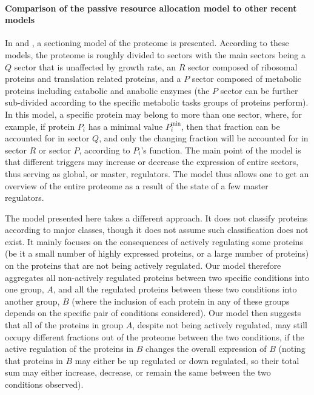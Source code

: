 \documentclass[10pt,letterpaper]{article}
\begin{document}
\paragraph{Comparison of the passive resource allocation model to other recent models}
In \cite{Scott2010,Scott2011,Scott2014} and \cite{Hui_2015}, a sectioning model of the proteome is presented.
According to these models, the proteome is roughly divided to sectors with the main sectors being a $Q$ sector that is unaffected by growth rate, an $R$ sector composed of ribosomal proteins and translation related proteins, and a $P$ sector composed of metabolic proteins including catabolic and anabolic enzymes (the $P$ sector can be further sub-divided according to the specific metabolic tasks groups of proteins perform).
In this model, a specific protein may belong to more than one sector, where, for example, if protein $P_i$ has a minimal value $P_i^{\min}$, then that fraction can be accounted for in sector $Q$, and only the changing fraction will be accounted for in sector $R$ or sector $P$, according to $P_i$'s function.
The main point of the model is that different triggers may increase or decrease the expression of entire sectors, thus serving as global, or master, regulators.
The model thus allows one to get an overview of the entire proteome as a result of the state of a few master regulators.

The model presented here takes a different approach.
It does not classify proteins according to major classes, though it does not assume such classification does not exist.
It mainly focuses on the consequences of actively regulating some proteins (be it a small number of highly expressed proteins, or a large number of proteins) on the proteins that are not being actively regulated.
Our model therefore aggregates all non-actively regulated proteins between two specific conditions into one group, $A$, and all the regulated proteins between these two conditions into another group, $B$ (where the inclusion of each protein in any of these groups depends on the specific pair of conditions considered).
Our model then suggests that all of the proteins in group $A$, despite not being actively regulated, may still occupy different fractions out of the proteome between the two conditions, if the active regulation of the proteins in $B$ changes the overall expression of $B$ (noting that proteins in $B$ may either be up regulated or down regulated, so their total sum may either increase, decrease, or remain the same between the two conditions observed).
\end{document}
